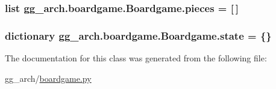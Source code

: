 \hypertarget{classgg__arch_1_1boardgame_1_1_boardgame_a7425432d37ef9f90d9cc187f972c2052}{
\subsubsection[{pieces}]{\setlength{\rightskip}{0pt plus 5cm}list gg\-\_\-arch.\-boardgame.\-Boardgame.\-pieces = \mbox{[}$\,$\mbox{]}\hspace{0.3cm}{\ttfamily [static]}}}\label{classgg__arch_1_1boardgame_1_1_boardgame_a7425432d37ef9f90d9cc187f972c2052}
\hypertarget{classgg__arch_1_1boardgame_1_1_boardgame_a16f3034f66bd2ced22229b5798b8facc}{
\subsubsection[{state}]{\setlength{\rightskip}{0pt plus 5cm}dictionary gg\-\_\-arch.\-boardgame.\-Boardgame.\-state = \{\}\hspace{0.3cm}{\ttfamily [static]}}}\label{classgg__arch_1_1boardgame_1_1_boardgame_a16f3034f66bd2ced22229b5798b8facc}


The documentation for this class was generated from the following file\-:\begin{DoxyCompactItemize}
\item 
gg\-\_\-arch/\hyperlink{boardgame_8py}{boardgame.\-py}\end{DoxyCompactItemize}
